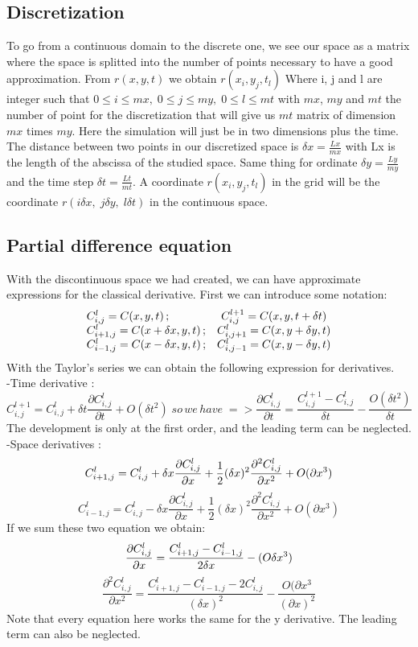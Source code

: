 \documentclass[a4paper,11pt]{report}
\begin{document}
\subsection{Discretization}
To go from a continuous domain to the discrete one, we see our space as a matrix where the space is splitted into the number of points necessary to have a good approximation. From $r(x,y,t)$ we obtain $r(x_{i},y_{j},t_{l})$ Where i, j and l are integer such that $0\leq i\leq mx,\; 0\leq j\leq my, \; 0 \leq l \leq mt$ with $mx$, $my$ and $mt$ the number of point for the discretization that will give us $mt$ matrix of dimension $mx$ times $my$. Here the simulation will just be in two dimensions plus the time. The distance between two points in our discretized space is $\delta x=\frac{Lx}{mx}$ with Lx is the length of the abscissa of the studied space. Same thing for ordinate  $\delta y=\frac{Ly}{my}$ and the time step  $\delta t=\frac{Lt}{mt}$. A coordinate $r(x_{i},y_{j},t_{l})$ in the grid will be the coordinate $r(i \delta x, \; j \delta y, \; l\delta t)$ in the continuous space.
\subsection{Partial difference equation}
With the discontinuous space we had created, we can have approximate expressions for the classical derivative. First we can introduce some notation:\\
$$
\begin{array}{l c}  
C_{i,j}^{l}=C(x,y,t) \,; & C_{i,j}^{l+1}=C(x,y,t+ \delta t) \\
C_{i+1,j}^{l}=C(x+\delta x,y,t)\,;  & C_{i,j+1}^{l}=C(x,y+\delta y,t) \\
C_{i-1,j}^{l}=C(x-\delta x,y,t)\,;  & C_{i,j-1}^{l}=C(x,y-\delta y,t) \\
\end{array}
$$
With the Taylor's series we can obtain the following expression for derivatives.\cite{Lewyt1967} \cite{Crank1975} \\
-Time derivative :
$$
C_{i,j}^{l+1}=C_{i,j}^{l}+ \delta t \frac{\partial C_{i,j}^{l}}{\partial t}+O(\delta t ^{2}) \;
so\, we\, have \;=> \frac{\partial C_{i,j}^{l}}{\partial t}= \frac{C_{i,j}^{l+1}-C_{i,j}^{l}}{\delta t} -\frac{O(\delta t ^{2})}{\delta t}
$$
The development is only at the first order, and the leading term can be neglected. \\
-Space derivatives : 
$$
C_{i+1,j}^{l}= C_{i,j}^{l}+ \delta x \frac{\partial C_{i,j}^{l}}{\partial x}+ \frac{1}{2 }(\delta x)^{2} \frac{\partial ^{2} C_{i,j}^{l}}{\partial x ^{2}}+ O (\partial x ^{3}) \\
$$
$$
C_{i-1,j}^{l}= C_{i,j}^{l}- \delta x \frac{ \partial C_{i,j}^{l}}{\partial x}+ \frac{1}{2}(\delta x)^{2} \frac{\partial ^{2} C_{i,j}^{l}}{\partial x ^{2}}+ O (\partial x ^{3}) 
$$
If we sum these two equation we obtain:
$$
\frac{\partial C_{i,j}^{l}}{\partial x}=\frac{C_{i+1,j}^{l}-C_{i-1,j}^{l}}{2\delta x}-(O\delta x ^{3}) \\
$$
$$
\frac{\partial ^{2} C_{i,j}^{l}}{\partial x ^{2}}=\frac{C_{i+1,j}^{l}-C_{i-1,j}^{l}-2 C_{i,j}^{l}}{(\delta x)^{2}}-\frac{O(\partial x^{3}}{(\partial x) ^{2}}
$$
Note that every equation here works the same for the y derivative. The leading term can also be neglected.
 
\end{document}
